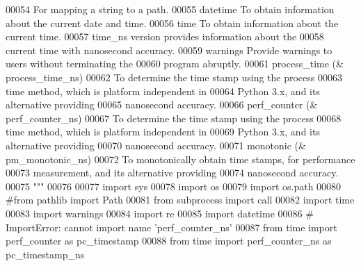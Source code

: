 \begin{DoxyCode}
00054 \textcolor{stringliteral}{                For mapping a string to a path.}
00055 \textcolor{stringliteral}{    datetime    To obtain information about the current date and time.}
00056 \textcolor{stringliteral}{    time        To obtain information about the current time.}
00057 \textcolor{stringliteral}{                time\_ns version provides information about the}
00058 \textcolor{stringliteral}{                    current time with nanosecond accuracy.}
00059 \textcolor{stringliteral}{    warnings    Provide warnings to users without terminating the}
00060 \textcolor{stringliteral}{                    program abruptly.}
00061 \textcolor{stringliteral}{    process\_time (& process\_time\_ns)}
00062 \textcolor{stringliteral}{                To determine the time stamp using the process}
00063 \textcolor{stringliteral}{                    time method, which is platform independent in}
00064 \textcolor{stringliteral}{                    Python 3.x, and its alternative providing}
00065 \textcolor{stringliteral}{                    nanosecond accuracy.}
00066 \textcolor{stringliteral}{    perf\_counter (& perf\_counter\_ns)}
00067 \textcolor{stringliteral}{                To determine the time stamp using the process}
00068 \textcolor{stringliteral}{                    time method, which is platform independent in}
00069 \textcolor{stringliteral}{                    Python 3.x, and its alternative providing}
00070 \textcolor{stringliteral}{                    nanosecond accuracy.}
00071 \textcolor{stringliteral}{    monotonic (& pm\_monotonic\_ns)}
00072 \textcolor{stringliteral}{                To monotonically obtain time stamps, for performance}
00073 \textcolor{stringliteral}{                    measurement, and its alternative providing}
00074 \textcolor{stringliteral}{                    nanosecond accuracy.}
00075 \textcolor{stringliteral}{"""}
00076 
00077 \textcolor{keyword}{import} sys
00078 \textcolor{keyword}{import} os
00079 \textcolor{keyword}{import} os.path
00080 \textcolor{comment}{#from pathlib import Path}
00081 \textcolor{keyword}{from} subprocess \textcolor{keyword}{import} call
00082 \textcolor{keyword}{import} time
00083 \textcolor{keyword}{import} warnings
00084 \textcolor{keyword}{import} re
00085 \textcolor{keyword}{import} datetime
00086 \textcolor{comment}{# ImportError: cannot import name 'perf\_counter\_ns'}
00087 \textcolor{keyword}{from} time \textcolor{keyword}{import} perf\_counter \textcolor{keyword}{as} pc\_timestamp
00088 \textcolor{keyword}{from} time \textcolor{keyword}{import} perf\_counter\_ns \textcolor{keyword}{as} pc\_timestamp\_ns

\end{DoxyCode}
